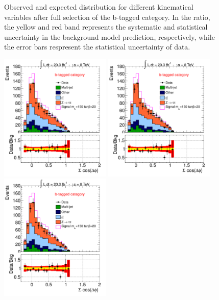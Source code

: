 \begin{figure}[!h]
\begin{center}
    \end{center}
    \caption{ Observed and expected distribution for different kinematical variables after full selection of the b-tagged category.
	 In the ratio, the yellow and red band represents the systematic and statistical uncertainty in the background model prediction, 
	respectively,  while the error bars respresent the statistical uncertainty of data.}
\end{figure}

\begin{figure}[!p]
     \begin{center}
	
            \includegraphics[page=9, width=0.47\textwidth]{figure/final_plots/BTag_fulll.pdf}
            \includegraphics[page=1, width=0.47\textwidth]{figure/final_plots/BTag_fulll.pdf}
            \includegraphics[page=2, width=0.47\textwidth]{figure/final_plots/BTag_fulll.pdf}

\end{center}
\end{figure}
